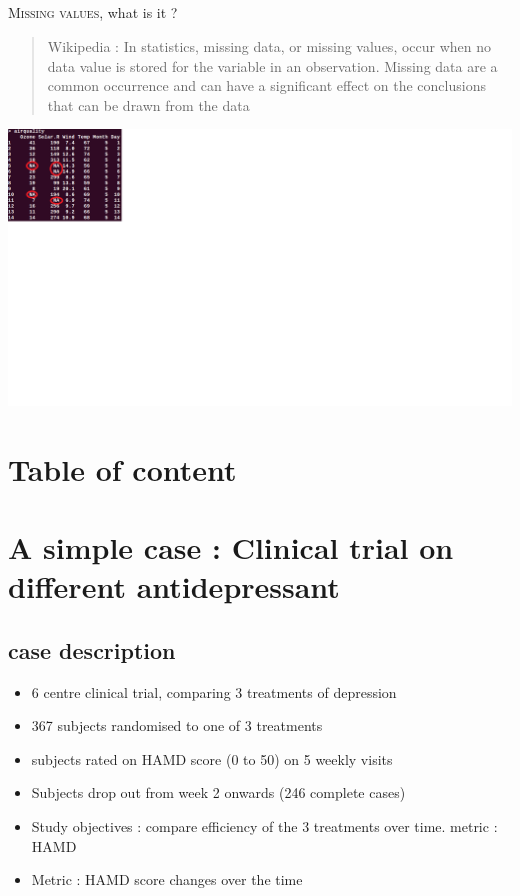 \documentclass{beamer}
\begin{document}
\subsection[Definition of nissing value]{}
\begin{frame}
  \textsc{Missing values}, what is it ?
  \begin{quote}
  Wikipedia : In statistics, missing data, or missing values, occur when no data value is stored for the variable in an observation. Missing data are a common occurrence and can have a significant effect on the conclusions that can be drawn from the data
  \end{quote}
  \includegraphics[width=25cm]{images/image_missingvalues.png}
\end{frame}

\section*{Table of content}
	\begin{frame}
		  \tableofcontents[]
	\end{frame}      

\section[A simple case]{A simple case : Clinical trial on different antidepressant}
\subsection{case description}
\begin{frame}
	\begin{itemize}
		\item<1->6 centre clinical trial, comparing 3 treatments of depression
		\item<2->367 subjects randomised to one of 3 treatments
		\item<3->subjects rated on HAMD score (0 to 50)  on 5 weekly visits
		\item<4->Subjects drop out from week 2 onwards (246 complete cases)
		\item<5->Study objectives : compare efficiency of the 3 treatments over time. metric : HAMD
	        \item<6-> Metric : HAMD score changes over the time
	\end{itemize}
\end{frame}
\end{document}
